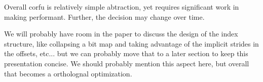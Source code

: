 \documentclass[10pt,twocolumn]{article}
\begin{document}
Overall corfu is relatively simple abtraction, yet requires significant
work in making performant. Further, the decision may change over time.

We will probably have room in the paper to discuss the design of the
index structure, like collapsing a bit map and taking advantage of
the implicit strides in the offsets, etc... but we can probably move
that to a later section to keep this presentation concise. We should
probably mention this aspect here, but overall that becomes a ortholognal
optimization.





\end{document}
